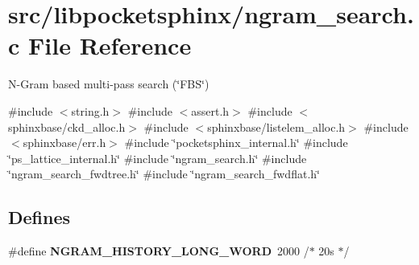 \section{src/libpocketsphinx/ngram\-\_\-search.c \-File \-Reference}
\label{ngram__search_8c}


\-N-\/\-Gram based multi-\/pass search (\char`\"{}\-F\-B\-S\char`\"{})  


{\ttfamily \#include $<$string.\-h$>$}\*
{\ttfamily \#include $<$assert.\-h$>$}\*
{\ttfamily \#include $<$sphinxbase/ckd\-\_\-alloc.\-h$>$}\*
{\ttfamily \#include $<$sphinxbase/listelem\-\_\-alloc.\-h$>$}\*
{\ttfamily \#include $<$sphinxbase/err.\-h$>$}\*
{\ttfamily \#include \char`\"{}pocketsphinx\-\_\-internal.\-h\char`\"{}}\*
{\ttfamily \#include \char`\"{}ps\-\_\-lattice\-\_\-internal.\-h\char`\"{}}\*
{\ttfamily \#include \char`\"{}ngram\-\_\-search.\-h\char`\"{}}\*
{\ttfamily \#include \char`\"{}ngram\-\_\-search\-\_\-fwdtree.\-h\char`\"{}}\*
{\ttfamily \#include \char`\"{}ngram\-\_\-search\-\_\-fwdflat.\-h\char`\"{}}\*
\subsection*{\-Defines}
\begin{DoxyCompactItemize}
\item 
\#define {\bfseries \-N\-G\-R\-A\-M\-\_\-\-H\-I\-S\-T\-O\-R\-Y\-\_\-\-L\-O\-N\-G\-\_\-\-W\-O\-R\-D}~2000 /$\ast$ 20s $\ast$/\label{ngram__search_8c_af9ad6b3d4ef3ad501da8e2296b25a131}

\end{DoxyCompactItemize}
